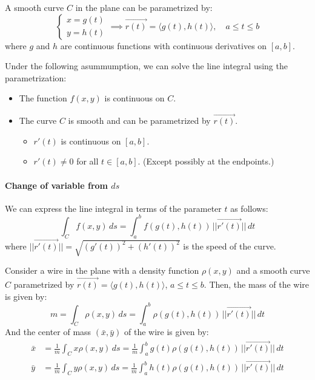 \documentclass[11pt]{report}
\begin{document}
\begin{definition}
    A smooth curve $C$ in the plane can be parametrized by:
    \begin{equation}
        \begin{cases}
            x = g(t) \\
            y = h(t)
        \end{cases} \implies \vec{r(t)} = \langle g(t), h(t) \rangle, \quad a \leq t \leq b
    \end{equation}
    where $g$ and $h$ are continuous functions with continuous derivatives on $[a,b]$.

    Under the following asummumption, we can solve the line integral using the parametrization:
    \begin{itemize}
        \item The function $f(x,y)$ is continuous on $C$.
        \item The curve $C$ is smooth and can be parametrized by $\vec{r(t)}$.
        \begin{itemize}
            \item $r'(t)$ is continuous on $[a,b]$.
            \item $r'(t) \neq 0$ for all $t \in [a,b]$. (Except possibly at the endpoints.) 
        \end{itemize}
    \end{itemize}
\end{definition}

\paragraph{Change of variable from $ds$} We can express the line integral in terms of the parameter $t$ as follows:
\begin{equation}
    \int_C f(x,y) \, ds = \int_a^b f(g(t), h(t)) \, ||\vec{r'(t)}|| \, dt
\end{equation}
where $||\vec{r'(t)}|| = \sqrt{(g'(t))^2 + (h'(t))^2}$ is the speed of the curve.

\begin{definition}
    Consider a wire in the plane with a density function $\rho(x,y)$ and a smooth curve $C$ parametrized by $\vec{r(t)} = \langle g(t), h(t) \rangle$, $a \leq t \leq b$. Then, the mass of the wire is given by:
    \begin{equation}
        m = \int_C \rho(x,y) \, ds = \int_a^b \rho(g(t), h(t)) \, ||\vec{r'(t)}|| \, dt
    \end{equation}
    And the center of mass $(\bar{x}, \bar{y})$ of the wire is given by:
    \begin{align}
        \bar{x} &= \frac{1}{m} \int_C x \rho(x,y) \, ds = \frac{1}{m} \int_a^b g(t) \rho(g(t), h(t)) \, ||\vec{r'(t)}|| \, dt \\
        \bar{y} &= \frac{1}{m} \int_C y \rho(x,y) \, ds = \frac{1}{m} \int_a^b h(t) \rho(g(t), h(t)) \, ||\vec{r'(t)}|| \, dt
    \end{align}
\end{definition}
\end{document}
